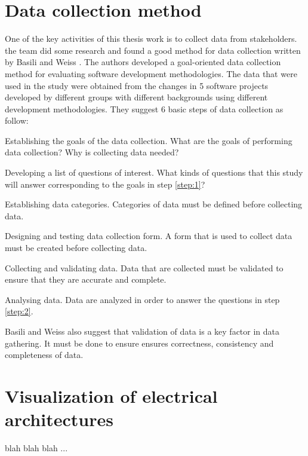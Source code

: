 \section{Data collection method}
One of the key activities of this thesis work is to collect data from stakeholders. the team did some research and found a good method for data collection written by Basili and Weiss \cite{Basili}. The authors developed a goal-oriented data collection method for evaluating software development methodologies. The data that were used in the study were obtained from the changes in 5 software projects developed by different groups with different backgrounds using different development methodologies. They suggest 6 basic steps of data collection as follow:\\[0.1cm]

\begin{step} \label{step:1}
Establishing the goals of the data collection. What are the goals of performing data collection? Why is collecting data needed?
\end{step}

\begin{step} \label{step:2}
Developing a list of questions of interest. What kinds of questions that this study will answer corresponding to the goals in step \ref{step:1}?
\end{step}

\begin{step} \label{step:3}
Establishing data categories. Categories of data must be defined before collecting data.
\end{step}

\begin{step} \label{step:4}
Designing and testing data collection form. A form that is used to collect data must be created before collecting data.
\end{step}

\begin{step} \label{step:5}
Collecting and validating data. Data that are collected must be validated to ensure that they are accurate and complete.
\end{step}

\begin{step} \label{step:6}
Analysing data. Data are analyzed in order to answer the questions in step \ref{step:2}.
\end{step}

Basili and Weiss also suggest that validation of data is a key factor in data gathering. It must be done to ensure ensures correctness, consistency and completeness of data.



\section{Visualization of electrical architectures}
blah blah blah ... \todo{[to be filled in]}